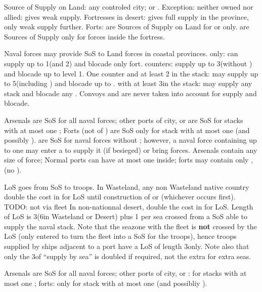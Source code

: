 \bparag Source of Supply on Land: any controled city; \TP or \COL.  Exception:
neither owned nor allied: gives weak supply.  Fortresses in desert: gives full
supply in the province, only weak supply further.
\bparag Forts: are Sources of Supply on Land for \LD or \LDE only.
\bparag \Presidios are Sources of Supply only for forces inside the fortress.

Naval forces may provide SoS to Land forces in coastal provinces.
\bparag \de only: can supply up to 1\LD (and 2\LDE) and blocade only fort.
\bparag \ND counters: supply up to 3\LD (without \ARMY) and blocade up to
\fortress level 1.
\bparag One \FLEET counter and at least 2 \ND in the stack: may supply up to
5\LD (including \ARMY) and blocade up to .
\bparag \FLEET\faceplus with at least 3\ND in the stack: may supply any stack
and blocade any \fortress.
\bparag Convoys and are never taken into account for supply and blocade.

Arsenals are SoS for all naval forces; other ports of city, \COL or \TP are
SoS for stacks with at most one \FLEET;
\bparag Forts (not of \TP) are SoS only for stack with at most one \ND
(and possibly \NDE).
\bparag \Presidios are SoS for naval forces without \FLEET;
however, a naval force containing up to one \FLEET may enter a
\Presidio to supply it (if besieged) or bring forces.
\bparag[Stacking:] Arsenals contain any size of force;
Normal ports can have at most one \FLEET inside;
forts may contain only \ND, \NDE (no \FLEET).

 LoS goes from SoS to troops.
\bparag In Wasteland, any non Wasteland native country double the cost in \MP
for LoS until construction of  or  (whichever occurs first). TODO: not via fleet
\bparag In non-nationnal desert, double the cost in \MP for LoS.
 Length of LoS is 3\MP (6\MP in
Wasteland or Desert) plus 1 per sea crossed from a SoS able to supply the
naval stack.
\bparag Note that the seazone with the fleet is \textbf{not} crossed by the
LoS (only entered to turn the fleet into a SoS for the troops), hence troops
supplied by ships adjacent to a port have a LoS of length 3\MP only.
\bparag Note also that only the 3\MP of ``supply by sea'' is doubled if
required, not the extra \MP for extra seas.

Arsenals are SoS for all naval forces; other ports of city, \COL or \TP: for
stacks with at most one \FLEET; forts: only for stack with at most one \ND
(and possibliy \NDE).

